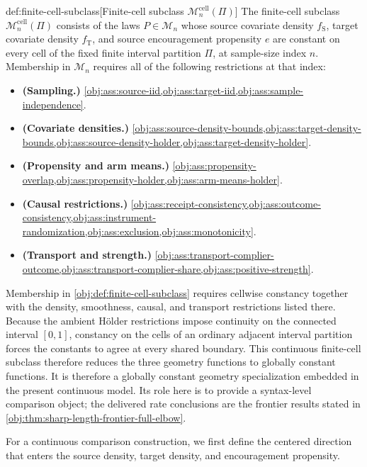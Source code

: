\begin{definitionv}{def:finite-cell-subclass}[Finite-cell subclass $\mathcal M_n^{\mathrm{cell}}(\Pi)$]
The finite-cell subclass \(\mathcal M_n^{\mathrm{cell}}(\Pi)\) consists of the laws \(P\in\mathcal M_n\) whose source covariate density \(f_{\mathrm S}\), target covariate density \(f_{\mathrm T}\), and source encouragement propensity \(e\) are constant on every cell of the fixed finite interval partition \(\Pi\), at sample-size index \(n\). Membership in \(\mathcal M_n\) requires all of the following restrictions at that index:
\begin{itemize}
\item \textbf{(Sampling.)} \cref{obj:ass:source-iid,obj:ass:target-iid,obj:ass:sample-independence}.
\item \textbf{(Covariate densities.)} \cref{obj:ass:source-density-bounds,obj:ass:target-density-bounds,obj:ass:source-density-holder,obj:ass:target-density-holder}.
\item \textbf{(Propensity and arm means.)} \cref{obj:ass:propensity-overlap,obj:ass:propensity-holder,obj:ass:arm-means-holder}.
\item \textbf{(Causal restrictions.)} \cref{obj:ass:receipt-consistency,obj:ass:outcome-consistency,obj:ass:instrument-randomization,obj:ass:exclusion,obj:ass:monotonicity}.
\item \textbf{(Transport and strength.)} \cref{obj:ass:transport-complier-outcome,obj:ass:transport-complier-share,obj:ass:positive-strength}.
\end{itemize}
\end{definitionv}

Membership in \cref{obj:def:finite-cell-subclass} requires cellwise constancy together with the density, smoothness, causal, and transport restrictions listed there. Because the ambient Hölder restrictions impose continuity on the connected interval \([0,1]\), constancy on the cells of an ordinary adjacent interval partition forces the constants to agree at every shared boundary. This continuous finite-cell subclass therefore reduces the three geometry functions to globally constant functions. It is therefore a globally constant geometry specialization embedded in the present continuous model. Its role here is to provide a syntax-level comparison object; the delivered rate conclusions are the frontier results stated in \cref{obj:thm:sharp-length-frontier-full-elbow}.

For a continuous comparison construction, we first define the centered direction that enters the source density, target density, and encouragement propensity.


